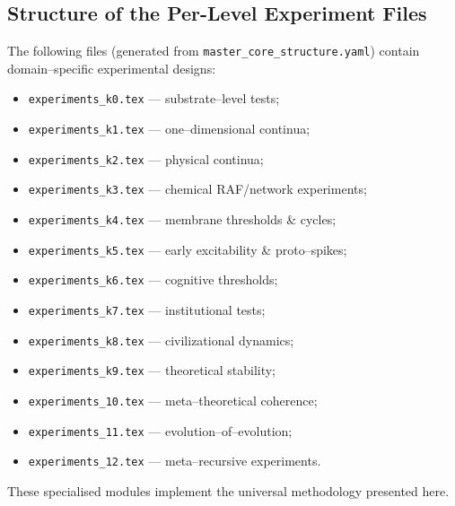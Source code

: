 \subsection{Structure of the Per-Level Experiment Files}

The following files (generated from \texttt{master\_core\_structure.yaml})
contain domain–specific experimental designs:

\begin{itemize}
    \item \texttt{experiments\_k0.tex} — substrate–level tests;
    \item \texttt{experiments\_k1.tex} — one–dimensional continua;
    \item \texttt{experiments\_k2.tex} — physical continua;
    \item \texttt{experiments\_k3.tex} — chemical RAF/network experiments;
    \item \texttt{experiments\_k4.tex} — membrane thresholds \& cycles;
    \item \texttt{experiments\_k5.tex} — early excitability \& proto–spikes;
    \item \texttt{experiments\_k6.tex} — cognitive thresholds;
    \item \texttt{experiments\_k7.tex} — institutional tests;
    \item \texttt{experiments\_k8.tex} — civilizational dynamics;
    \item \texttt{experiments\_k9.tex} — theoretical stability;
    \item \texttt{experiments\_{10}.tex} — meta–theoretical coherence;
    \item \texttt{experiments\_{11}.tex} — evolution–of–evolution;
    \item \texttt{experiments\_{12}.tex} — meta–recursive experiments.
\end{itemize}

These specialised modules implement the universal methodology presented here.
